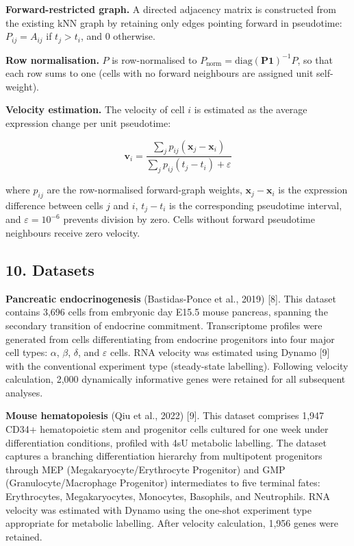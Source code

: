 \documentclass[11pt]{article}
\begin{document}
\textbf{Forward-restricted graph.} A directed adjacency matrix is constructed from the existing kNN graph by retaining only edges pointing forward in pseudotime: $P_{ij} = A_{ij}$ if $t_j > t_i$, and 0 otherwise.

\textbf{Row normalisation.} $P$ is row-normalised to $P_{\text{norm}} = \mathrm{diag}(\mathbf{P}\mathbf{1})^{-1} P$, so that each row sums to one (cells with no forward neighbours are assigned unit self-weight).

\textbf{Velocity estimation.} The velocity of cell $i$ is estimated as the average expression change per unit pseudotime:


\begin{equation}
\mathbf{v}_i = \frac{\displaystyle\sum_j p_{ij}\left(\mathbf{x}_j - \mathbf{x}_i\right)}{\displaystyle\sum_j p_{ij}\left(t_j - t_i\right) + \varepsilon} 
\end{equation}


where $p_{ij}$ are the row-normalised forward-graph weights, $\mathbf{x}_j - \mathbf{x}_i$ is the expression difference between cells $j$ and $i$, $t_j - t_i$ is the corresponding pseudotime interval, and $\varepsilon = 10^{-6}$ prevents division by zero. Cells without forward pseudotime neighbours receive zero velocity.



\subsection*{10. Datasets}

\textbf{Pancreatic endocrinogenesis} (Bastidas-Ponce et al., 2019) [8]. This dataset contains 3,696 cells from embryonic day E15.5 mouse pancreas, spanning the secondary transition of endocrine commitment. Transcriptome profiles were generated from cells differentiating from endocrine progenitors into four major cell types: $\alpha$, $\beta$, $\delta$, and $\varepsilon$ cells. RNA velocity was estimated using Dynamo [9] with the conventional experiment type (steady-state labelling). Following velocity calculation, 2,000 dynamically informative genes were retained for all subsequent analyses.

\textbf{Mouse hematopoiesis} (Qiu et al., 2022) [9]. This dataset comprises 1,947 CD34+ hematopoietic stem and progenitor cells cultured for one week under differentiation conditions, profiled with 4sU metabolic labelling. The dataset captures a branching differentiation hierarchy from multipotent progenitors through MEP (Megakaryocyte/Erythrocyte Progenitor) and GMP (Granulocyte/Macrophage Progenitor) intermediates to five terminal fates: Erythrocytes, Megakaryocytes, Monocytes, Basophils, and Neutrophils. RNA velocity was estimated with Dynamo using the one-shot experiment type appropriate for metabolic labelling. After velocity calculation, 1,956 genes were retained.
\end{document}
